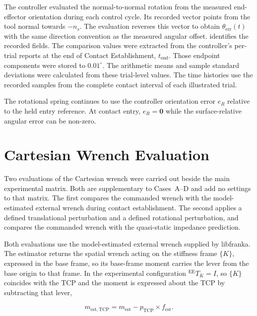 The controller evaluated the normal-to-normal rotation from the measured
end-effector orientation during each control cycle. Its recorded vector points
from the tool normal towards \mbox{\(-n_s\)}.
The evaluation reverses this vector to obtain
\mbox{\(\theta_{\mathrm{err}}(t)\)} with the same direction convention as the
measured angular offset.  identifies the recorded fields.
The comparison values were extracted from the controller's per-trial reports
at the end of Contact Establishment, \mbox{\(t_{\mathrm{end}}\)}.
Those endpoint components were stored to \mbox{\(0.01^\circ\)}.
The arithmetic means and sample standard deviations were calculated from these
trial-level values. The time histories use the recorded samples from the
complete contact interval of each illustrated trial.

The rotational spring continues to use the controller orientation error
\mbox{\(e_R\)} relative to the held entry reference.
At contact entry, \mbox{\(e_R=\mathbf{0}\)} while the surface-relative angular
error can be non-zero.


\section{Cartesian Wrench Evaluation}
\label{sec:wrench_evaluation_method}

Two evaluations of the Cartesian wrench were carried out beside the main
experimental matrix. Both are supplementary to Cases~A--D and add no settings
to that matrix. The first compares the commanded wrench with the
model-estimated external wrench during contact establishment. The second
applies a defined translational perturbation and a defined rotational
perturbation, and compares the commanded wrench with the quasi-static
impedance prediction.

Both evaluations use the model-estimated external wrench supplied by libfranka.
The estimator returns the spatial wrench acting on the stiffness frame \mbox{\(\{K\}\)},
expressed in the base frame, so its base-frame moment carries the lever from
the base origin to that frame. In the experimental configuration
\mbox{\({}^{\mathrm{EE}}T_K=I\)}, so \mbox{\(\{K\}\)} coincides with the TCP
and the moment is expressed about the TCP by subtracting that lever,

\[
m_{\mathrm{est,TCP}}=m_{\mathrm{est}}-p_{\mathrm{TCP}}\times f_{\mathrm{est}}.
\]

